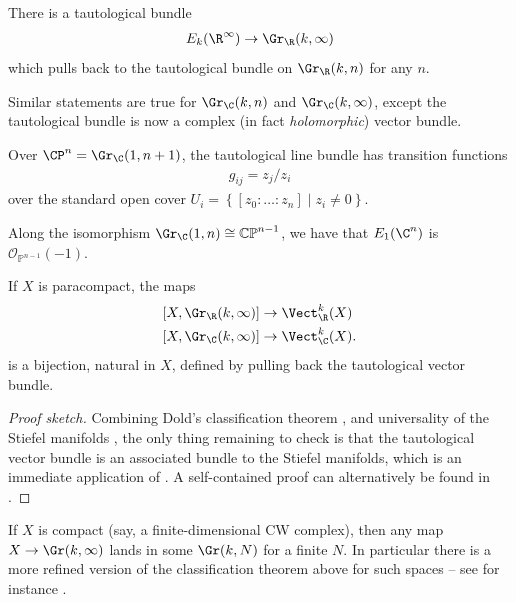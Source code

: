 \documentclass[11pt]{book}
\begin{document}
\begin{proposition} There is a tautological bundle
\begin{align*}
    E_k(\R^\infty) \to \Gr_\R(k,\infty)
\end{align*}
which pulls back to the tautological bundle on $\Gr_\R(k,n)$ for any $n$.
\end{proposition}


\begin{remark} Similar statements are true for $\Gr_\C(k,n)$ and $\Gr_\C(k,\infty)$, except the tautological bundle is now a complex (in fact \emph{holomorphic}) vector bundle.
\end{remark}

\begin{example} Over $\CP^n = \Gr_\C(1,n+1)$, the tautological line bundle has transition functions
\begin{align*}
    g_{ij} = z_j/z_i
\end{align*}
over the standard open cover $U_i = \left\{ [z_0: \ldots : z_n] \mid z_i\ne 0 \right\}$.
\end{example}

\begin{remark} Along the isomorphism $\Gr_\C(1,n) \cong \mathbb{CP}^{n-1}$, we have that $E_1(\C^n)$ is $\mathcal{O}_{\mathbb{P}^{n-1}}(-1)$.
\end{remark}

\begin{theorem} If $X$ is paracompact, the maps
\begin{align*}
    \left[ X,\Gr_\R(k,\infty) \right] &\to \Vect_\R^k(X) \\
    \left[ X, \Gr_\C(k,\infty) \right] &\to \Vect_\C^k(X).
\end{align*}
is a bijection, natural in $X$, defined by pulling back the tautological vector bundle.
\end{theorem}
\begin{proof}[Proof sketch] Combining Dold's classification theorem , and universality of the Stiefel manifolds , the only thing remaining to check is that the tautological vector bundle is an associated bundle to the Stiefel manifolds, which is an immediate application of . A self-contained proof can alternatively be found in \cite[1.16]{hatcherVectorBundlesKtheory}.
\end{proof}

\begin{remark} If $X$ is compact (say, a finite-dimensional CW complex), then any map $X \to \Gr(k,\infty)$ lands in some $\Gr(k,N)$ for a finite $N$. In particular there is a more refined version of the classification theorem above for such spaces -- see for instance \cite[19.4]{Steenrod-fibre-bundles}. 
\end{remark}
\end{document}
